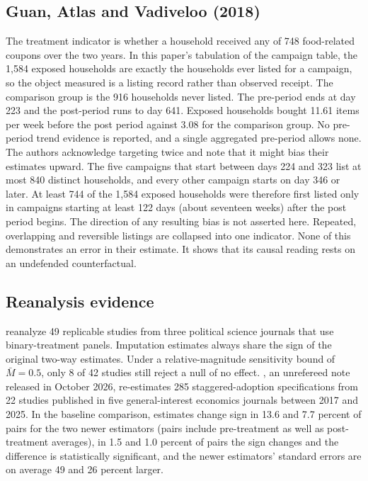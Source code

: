 \documentclass[11pt]{article}
\begin{document}
\subsection{Guan, Atlas and Vadiveloo (2018)}
The treatment indicator is whether a household received
any of 748 food-related coupons over the two years. In this paper's tabulation of the campaign table,
the 1,584 exposed households are exactly the households ever listed for a campaign, so the object
measured is a listing record rather than observed receipt. The comparison group is the 916 households never listed. The pre-period ends at day
223 and the post-period runs to day 641. Exposed households bought 11.61 items per week before the post
period against 3.08 for the comparison group. No pre-period trend evidence is reported, and a single
aggregated pre-period allows none. The authors acknowledge targeting twice and note that it might bias
their estimates upward.
The five campaigns that start between days 224 and 323 list at most 840 distinct households, and
every other campaign starts on day 346 or later. At least 744 of the 1,584 exposed households
were therefore first listed only in campaigns starting at least 122 days (about seventeen weeks)
after the post period begins. The direction of any resulting bias is not asserted here. Repeated,
overlapping and reversible listings are collapsed into one indicator. None of this demonstrates an
error in their estimate. It shows that its causal reading rests on an undefended counterfactual.

\subsection{Reanalysis evidence}
\citet{chiu2026} reanalyze 49 replicable studies from three political
science journals that use binary-treatment panels. Imputation estimates always share the sign of the
original two-way estimates. Under a relative-magnitude sensitivity bound of $\bar M=0.5$, only 8 of 42
studies still reject a null of no effect. \citet{hull2026}, an unrefereed note released in October 2026,
re-estimates 285 staggered-adoption specifications from 22 studies published in five general-interest
economics journals between 2017 and 2025. In the baseline comparison, estimates change sign in 13.6 and
7.7 percent of pairs for the two newer estimators (pairs include pre-treatment as well as
post-treatment averages), in 1.5 and 1.0 percent of pairs the sign
changes and the difference is statistically significant, and the newer estimators' standard errors are on average
49 and 26 percent larger.
\end{document}
